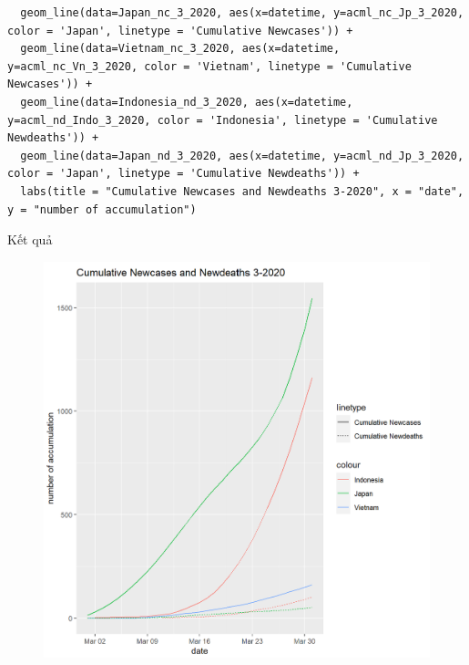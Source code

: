 \documentclass[a4paper]{article}
\theoremstyle{definition}
\begin{document}
\begin{enumerate}[1)]
\begin{lstlisting}
  geom_line(data=Japan_nc_3_2020, aes(x=datetime, y=acml_nc_Jp_3_2020, color = 'Japan', linetype = 'Cumulative Newcases')) +
  geom_line(data=Vietnam_nc_3_2020, aes(x=datetime, y=acml_nc_Vn_3_2020, color = 'Vietnam', linetype = 'Cumulative Newcases')) +
  geom_line(data=Indonesia_nd_3_2020, aes(x=datetime, y=acml_nd_Indo_3_2020, color = 'Indonesia', linetype = 'Cumulative Newdeaths')) +
  geom_line(data=Japan_nd_3_2020, aes(x=datetime, y=acml_nd_Jp_3_2020, color = 'Japan', linetype = 'Cumulative Newdeaths')) +
  labs(title = "Cumulative Newcases and Newdeaths 3-2020", x = "date", y = "number of accumulation")
    \end{lstlisting}
    Kết quả
    \begin{figure}[H]
    \begin{center}
        \includegraphics[scale=0.4]{vi/cml_new_3_2020.png}

\end{center}
\end{figure}
\end{enumerate}
\end{document}
